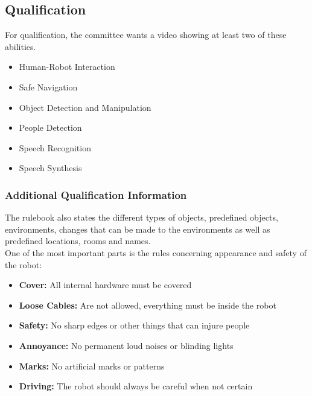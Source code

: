 \subsection{Qualification}\label{qualification}
\indent For qualification, the committee wants a video showing at least two of these abilities.
\vspace{0.15cm}
\begin{itemize}
    \item Human-Robot Interaction
    \item Safe Navigation
    \item Object Detection and Manipulation
    \item People Detection
    \item Speech Recognition
    \item Speech Synthesis
\end{itemize}

\subsubsection{Additional Qualification Information}
The rulebook also states the different types of objects, predefined objects, environments, changes that can be made to the environments as well as predefined locations, rooms and names.\\
 One of the most important parts is the rules concerning appearance and safety of the robot:
\vspace{0.15cm}
\begin{itemize}
    \item \textbf{Cover:} All internal hardware must be covered
    \item \textbf{Loose Cables:} Are not allowed, everything must be inside the robot
    \item \textbf{Safety:} No sharp edges or other things that can injure people
    \item \textbf{Annoyance:} No permanent loud noises or blinding lights
    \item \textbf{Marks:} No artificial marks or patterns
    \item \textbf{Driving:} The robot should always be careful when not certain
\end{itemize}

